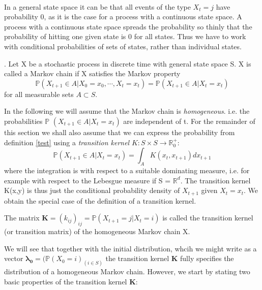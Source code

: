 \documentclass[a4paper,10pt]{article}
\newenvironment{definition}[1][Definition]{\begin{trivlist}
\item[\hskip \labelsep {\bfseries #1}]}{\end{trivlist}}
\begin{document}
 \paragraph{} In a general state space it can be that all events of the type ${X_t = j}$ have probability 0,
 as it is the case for a process with a continuous state space. A process with a continuous state space spreads 
 the probability so thinly that the probability of hitting one given state is 0 for all states. Thus we have to work
 with conditional probabilities of sets of states, rather than individual states.
 \begin{definition}[Markov chain].\label{test}
 Let X be a stochastic process in discrete time with general state space S. X is called a Markov chain if X satisfies
 the Markov property
 \begin{equation}
  \mathbb{P}(X_{t+1} \in A|X_0 = x_0, \cdots , X_t = x_t) = \mathbb{P}(X_{t+1} \in A| X_t = x_t)
 \end{equation}
for all measurable sets $A \subset S$. 
 \end{definition}
   In the following we will assume that the Markov chain is \textit{homogeneous}. i.e. the probabilities $\mathbb{P}$
  $(X_{t+1} \in A| X_t = x_t)$ are independent of t. For the remainder of this section we shall also assume that we 
  can express the probability from definition \ref{test} using a \textit{transition kernel} $K: S \times S \rightarrow
  \mathbb{R}^{+}_{0}:$
  \begin{equation}\label{1.3}
   \mathbb{P}(X_{t+1} \in A| X_t = x_t) = \int_A K(x_t,x_{t+1})dx_{t+1}
  \end{equation}
where the integration is with respect to a suitable dominating measure, i.e. for example with respect to the Lebesgue
measure if S = $\mathbb{R}^d$. The transition kernel K(x,y) is thus just the conditional probability density of $X_{t+1}$
given $X_t = x_t$.
     We obtain the special case of the definition of a transition kernel.
     \begin{definition}
      The matrix $ \mathbf{K} = (k_{ij})_{ij} = \mathbb{P}(X_{t+1} = j|X_{t} = i)$ is called the transition
      kernel (or transition matrix) of the homogeneous Markov chain X. 
     \end{definition}
We will see that together with the initial distribution, whcih we might write as a vector $\mathbf{\lambda_{0}} = 
(\mathbb{P}(X_{0} = i) _{(i \in S)}$ the transition kernel $\mathbf{K}$ fully specifies the distribution of a 
homogeneous Markov chain. 
    However, we start by stating two basic properties of the transition kernel \textbf{K}: 
\end{document}
